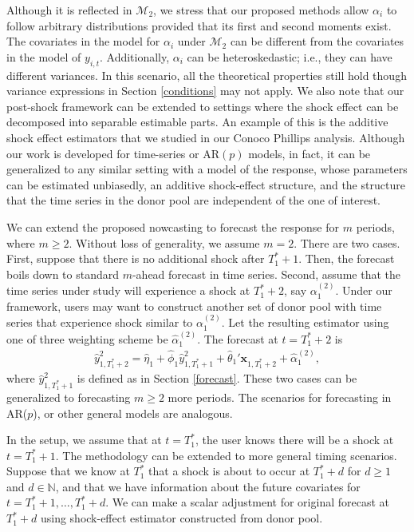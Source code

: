 \documentclass[11pt,3p,review,authoryear]{elsarticle}
\def\mc#1{\mathcal{#1}} %
\theoremstyle{definition}
\begin{document}
Although it is reflected in $\mc{M}_2$, we stress that our proposed methods allow $\alpha_i$ to follow arbitrary distributions provided that its first and second moments exist. The covariates in the model for $\alpha_i$ under $\mc{M}_2$ can be different from the covariates in the model of $y_{i,t}$.  Additionally, $\alpha_i$ can be heteroskedastic; i.e.,  they can have different variances. In this scenario, all the theoretical properties still hold though variance expressions in Section \ref{conditions} may not apply. We also note that our post-shock framework can be extended to settings where the shock effect can be decomposed into separable estimable parts. An example of this is the additive shock effect estimators that we studied in our Conoco Phillips analysis. Although our work is developed for time-series or AR$(p)$ models, in fact, it can be generalized to any similar setting with a model of the response, whose parameters can be estimated unbiasedly, an additive shock-effect structure, and the structure that the time series in the donor pool are independent of the one of interest.

We can extend the proposed nowcasting to forecast  the response for $m$ periods, where $m\geq 2$. Without loss of generality, we assume $m = 2$. There are two cases. First, suppose that there is no additional shock after $T_1^*+1$. Then, the forecast boils down to standard $m$-ahead forecast in time series. Second, assume that the time series under study will experience a shock at $T_1^* + 2$, say $\alpha_1^{(2)}$.  Under our framework, users may want to construct another set of donor pool with time series that experience shock similar to  $\alpha_1^{(2)}$. Let the resulting estimator using one of  three weighting scheme be $\hat{\alpha}_1^{(2)}$.  The forecast at $t = T_1^* + 2$ is
\begin{align*}
  \hat{y}^2_{1, T_1^*+2}=\hat{\eta}_1 + \hat{\phi}_1 \hat{y}_{1, T_1^* + 1}^2 + \hat{\theta}_1' \mathbf{x}_{1, T_1^* +2} + \hat{\alpha}_1^{(2)},
\end{align*} 
where $\hat{y}_{1, T_1^* + 1}^2$ is defined as in Section \ref{forecast}. These two cases can be generalized to  forecasting $m\geq 2$ more periods. The scenarios for forecasting in AR($p$), or other general models are analogous.

In the setup, we assume that at $t=T_1^*$, the user knows there will be a shock at $t=T_1^*+1$. The methodology can be extended to more general timing scenarios. Suppose that we know at $T_1^*$ that a shock is about to occur at $T_1^* + d$ for $d\geq 1$ and $d\in \mathbb{N}$, and that we have information about the future covariates for $t = T_1^* +1 , \ldots, T_1^* + d$. We can make a scalar adjustment for original forecast at $T_1^*+d$ using shock-effect estimator constructed from donor pool.
\end{document}

